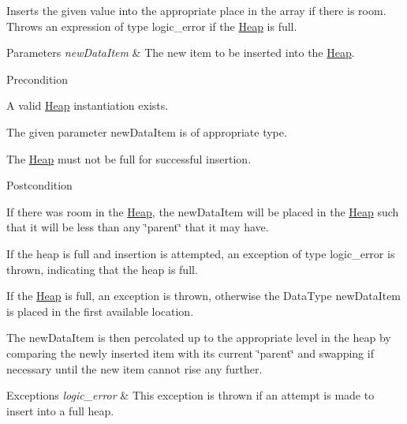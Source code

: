 \-Inserts the given value into the appropriate place in the array if there is room. \-Throws an expression of type logic\-\_\-error if the \hyperlink{class_heap}{\-Heap} is full.


\begin{DoxyParams}{\-Parameters}
{\em new\-Data\-Item} & \-The new item to be inserted into the \hyperlink{class_heap}{\-Heap}.\\
\hline
\end{DoxyParams}
\begin{DoxyPrecond}{\-Precondition}

\begin{DoxyEnumerate}
\item \-A valid \hyperlink{class_heap}{\-Heap} instantiation exists.
\item \-The given parameter new\-Data\-Item is of appropriate type.
\item \-The \hyperlink{class_heap}{\-Heap} must not be full for successful insertion.
\end{DoxyEnumerate}
\end{DoxyPrecond}
\begin{DoxyPostcond}{\-Postcondition}

\begin{DoxyEnumerate}
\item \-If there was room in the \hyperlink{class_heap}{\-Heap}, the new\-Data\-Item will be placed in the \hyperlink{class_heap}{\-Heap} such that it will be less than any \char`\"{}parent\char`\"{} that it may have.
\item \-If the heap is full and insertion is attempted, an exception of type logic\-\_\-error is thrown, indicating that the heap is full.
\end{DoxyEnumerate}
\end{DoxyPostcond}

\begin{DoxyEnumerate}
\item \-If the \hyperlink{class_heap}{\-Heap} is full, an exception is thrown, otherwise the \-Data\-Type new\-Data\-Item is placed in the first available location.
\item \-The new\-Data\-Item is then percolated up to the appropriate level in the heap by comparing the newly inserted item with its current \char`\"{}parent\char`\"{} and swapping if necessary until the new item cannot rise any further.
\end{DoxyEnumerate}


\begin{DoxyExceptions}{\-Exceptions}
{\em logic\-\_\-error} & \-This exception is thrown if an attempt is made to insert into a full heap.\\
\hline
\end{DoxyExceptions}

